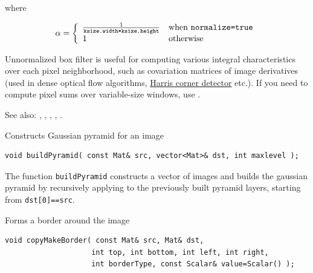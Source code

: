 where

\[\alpha=\left\{ \begin{array}{l l} \frac{1}{\texttt{ksize.width*ksize.height}} & \mbox{when \texttt{normalize=true}}\\ 1 & \mbox{otherwise}\\ \end{array} \right. \]

Unnormalized box filter is useful for computing various integral characteristics over each pixel neighborhood, such as covariation matrices of image derivatives (used in dense optical flow algorithms, \hyperref[conerHarris]{Harris corner detector} etc.). If you need to compute pixel sums over variable-size windows, use .

See also: , , , , .

\label{buildPyramid}
Constructs Gaussian pyramid for an image

\begin{lstlisting}
void buildPyramid( const Mat& src, vector<Mat>& dst, int maxlevel );
\end{lstlisting}
\begin{description}
\end{description}

The function \texttt{buildPyramid} constructs a vector of images and builds the gaussian pyramid by recursively applying  to the previously built pyramid layers, starting from \texttt{dst[0]==src}.

\label{copyMakeBorder}
Forms a border around the image

\begin{lstlisting}
void copyMakeBorder( const Mat& src, Mat& dst,
                    int top, int bottom, int left, int right,
                    int borderType, const Scalar& value=Scalar() );
\end{lstlisting}
\begin{description}
\end{description}

